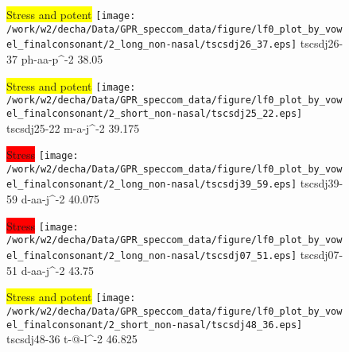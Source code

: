 \documentclass{article}
\begin{document}
\begin{figure}[t]
\begin{minipage}[b]{.24\textwidth}
\colorbox{yellow}{Stress and potent}
\centering
\texttt{[image: /work/w2/decha/Data/GPR\_speccom\_data/figure/lf0\_plot\_by\_vowel\_finalconsonant/2\_long\_non-nasal/tscsdj26\_37.eps]}
tscsdj26-37 ph-aa-p\textasciicircum-2 38.05
\end{minipage}
\begin{minipage}[b]{.24\textwidth}
\colorbox{yellow}{Stress and potent}
\centering
\texttt{[image: /work/w2/decha/Data/GPR\_speccom\_data/figure/lf0\_plot\_by\_vowel\_finalconsonant/2\_short\_non-nasal/tscsdj25\_22.eps]}
tscsdj25-22 m-a-j\textasciicircum-2 39.175
\end{minipage}
\begin{minipage}[b]{.24\textwidth}
\colorbox{red}{Stress}
\centering
\texttt{[image: /work/w2/decha/Data/GPR\_speccom\_data/figure/lf0\_plot\_by\_vowel\_finalconsonant/2\_long\_non-nasal/tscsdj39\_59.eps]}
tscsdj39-59 d-aa-j\textasciicircum-2 40.075
\end{minipage}
\begin{minipage}[b]{.24\textwidth}
\colorbox{red}{Stress}
\centering
\texttt{[image: /work/w2/decha/Data/GPR\_speccom\_data/figure/lf0\_plot\_by\_vowel\_finalconsonant/2\_long\_non-nasal/tscsdj07\_51.eps]}
tscsdj07-51 d-aa-j\textasciicircum-2 43.75
\end{minipage}
\end{figure}
\clearpage
\begin{figure}[t]
\begin{minipage}[b]{.24\textwidth}
\colorbox{yellow}{Stress and potent}
\centering
\texttt{[image: /work/w2/decha/Data/GPR\_speccom\_data/figure/lf0\_plot\_by\_vowel\_finalconsonant/2\_short\_non-nasal/tscsdj48\_36.eps]}
tscsdj48-36 t-@-l\textasciicircum-2 46.825
\end{minipage}
\end{figure}
\end{document}
